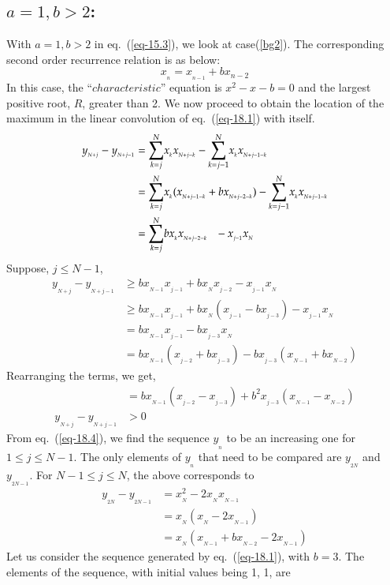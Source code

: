 \begin{multicols}{2}
\section{\underline{$a=1, b > 2$}:}\label{section-18}
With $a=1, b > 2$ in eq.~(\ref{eq-15.3}), we look at case(\ref{bg2}). The corresponding second order recurrence relation is as below:
\begin{equation}
x_{_n} =  x_{_{n-1}} + bx_{{n-2}}\label{eq-18.1}
\end{equation}
In this case, the ``$characteristic$'' equation is $x^2 - x - b = 0$ and the largest positive root, $R$, greater than 2. We now proceed to obtain the location of the maximum in the linear convolution of eq.~(\ref{eq-18.1}) with itself.
{\fontsize{9}{10}\selectfont\begin{align}
y_{_{N+j}} - y_{_{N+j-1}} &= \displaystyle{\sum_{k=j}^{N}}x_{_{k}}x_{_{N+j-k}} -  \displaystyle{\sum_{k=j-1}^{N}}x_{_k}x_{_{N+j-1-k}}\nonumber\\
&= \displaystyle{\sum_{k=j}^{N}}x_{_{k}}(x_{_{N+j-1-k}}+b x_{_{N+j-2-k}}) -  \displaystyle{\sum_{k=j-1}^{N}}x_{_k}x_{_{N+j-1-k}}\nonumber\\
&= \displaystyle{\sum_{k=j}^{N}}bx_{_{k}}x_{_{N+j-2-k}} \hspace{0.1in}- x_{_{j-1}}x_{_N}\label{eq-18.2}
\end{align}}
Suppose, $j \leq N-1$,
\begin{align}
y_{_{N+j}} - y_{_{N+j-1}}&\geq bx_{_{N-1}}x_{_{j-1}} + b x_{_N}x_{_{j-2}} - x_{_{j-1}}x_{_N}\nonumber\\
&\geq bx_{_{N-1}}x_{_{j-1}} + b x_{_N}(x_{_{j-1}}- b x_{_{j-3}})- x_{_{j-1}}x_{_N}\nonumber\\
&= bx_{_{N-1}}x_{_{j-1}} - bx_{_{j-3}}x_{_N}\nonumber\\
&= bx_{_{N-1}}(x_{_{j-2}} + bx_{_{j-3}}) - b x_{_{j-3}}(x_{_{N-1}} + bx_{_{N-2}})\nonumber
\end{align}
Rearranging the terms, we get,
\begin{align}
&= bx_{_{N-1}}(x_{_{j-2}} - x_{_{j-3}}) + b^2x_{_{j-3}}(x_{_{N-1}} - x_{_{N-2}})\label{eq-18.3}\\
y_{_{N+j}} - y_{_{N+j-1}}&> 0\label{eq-18.4}
\end{align}
From eq.~(\ref{eq-18.4}), we find the sequence $y_{_n}$ to be an increasing one for $1 \leq j \leq N-1$. The only elements of $y_{_n}$ that need to be compared are $y_{_{2N}}$ and $y_{_{2N-1}}$.
For\hspace{0.1in} $N-1 \leq j \leq N$,\hspace{0.1in} the above corresponds to
\begin{align}
y_{_{2N}} - y_{_{2N-1}} &= x_{_N}^2 - 2x_{_N}x_{_{N-1}}\label{eq-18.5}\\
&= x_{_N}(x_{_N} - 2x_{_{N-1}})\label{eq-18.6}\\
&= x_{_N}(x_{_{N-1}}+ b x_{_{N-2}}- 2x_{_{N-1}})\label{eq-18.7}
\end{align} 
Let us consider the sequence generated by eq.~(\ref{eq-18.1}), with $b=3$. The elements of the sequence, with initial values being 1, 1, are


\end{multicols}
